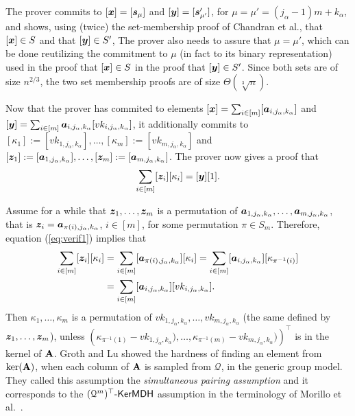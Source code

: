 The prover commits to $[{\boldsymbol{x}}]=[{\boldsymbol{s}}_\mu]$ and $[{\boldsymbol{y}}]=[{\boldsymbol{s}}'_{\mu'}]$, for $\mu=\mu'=(j_\alpha-1)m+k_\alpha$, and shows, using (twice) the set-membership proof of Chandran et al., that $[{\boldsymbol{x}}]\in S$ and that $[{\boldsymbol{y}}]\in S'$, 
The prover also needs to assure that $\mu=\mu'$, which can be done reutilizing the commitment to $\mu$ (in fact to its binary representation) used in the proof that $[{\boldsymbol{x}}]\in S$ in the proof that $[{\boldsymbol{y}}]\in S'$. Since both sets are of size $n^{2/3}$, the two set membership proofs are of size $\Theta(\sqrt[3]{n})$.
 
Now that the prover has commited to elements $[{\boldsymbol{x}}]=\sum_{i\in[m]}[{\boldsymbol{a}}_{i,j_\alpha,k_\alpha}]$ and $[{\boldsymbol{y}}]=\sum_{i\in[m]}{\boldsymbol{a}}_{i,j_\alpha,k_\alpha}[vk_{i,j_\alpha,k_\alpha}]$, it additionally commits to $[\kappa_1]:=[vk_{1,j_\alpha,k_\alpha}],\allowbreak\ldots,\allowbreak[\kappa_m]:=[vk_{m,j_\alpha,k_\alpha}]$ and $[{\boldsymbol{z}}_1]:=[{\boldsymbol{a}}_{1,j_\alpha,k_\alpha}],\ldots,[{\boldsymbol{z}}_m]:=[{\boldsymbol{a}}_{m,j_\alpha,k_\alpha}]$. The prover now gives a proof that
\begin{equation}
\sum_{i\in[m]}[{\boldsymbol{z}}_i][\kappa_i]=[{\boldsymbol{y}}][1]. \label{eq:verif1}
\end{equation}

Assume for a while that ${\boldsymbol{z}}_1,\ldots,{\boldsymbol{z}}_m$ is a permutation of ${\boldsymbol{a}}_{1,j_\alpha,k_\alpha},\ldots,{\boldsymbol{a}}_{m,j_\alpha,k_\alpha}$, that is ${\boldsymbol{z}}_i={\boldsymbol{a}}_{\pi(i),j_\alpha,k_\alpha}$, $i\in[m]$, for some permutation $\pi\in S_m$. Therefore, equation (\ref{eq:verif1}) implies that
\begin{align*}
\sum_{i\in[m]}[{\boldsymbol{z}}_i][\kappa_i]&=\sum_{i\in[m]}[{\boldsymbol{a}}_{\pi(i),j_\alpha,k_\alpha}][\kappa_i]=\sum_{i\in[m]}[{\boldsymbol{a}}_{i,j_\alpha,k_\alpha}][\kappa_{\pi^{-1}(i)}]\\
&=\sum_{i\in[m]}[{\boldsymbol{a}}_{i,j_\alpha,k_\alpha}][vk_{i,j_\alpha,k_\alpha}].
\end{align*}
Then $\kappa_1,\ldots,\kappa_m$ is a permutation of $vk_{1,j_\alpha,k_\alpha},\ldots,vk_{m,j_\alpha,k_\alpha}$ (the same defined by ${\boldsymbol{z}}_1,\ldots,{\boldsymbol{z}}_m$), unless $(\kappa_{\pi^{-1}(1)}-{vk_{1,j_\alpha,k_\alpha}),\ldots,\kappa_{\pi^{-1}(m)}-vk_{m,j_\alpha,k_\alpha})})^\top$ is in the kernel of $\mathbf{{A}}$. Groth and Lu showed the hardness of finding an element from $\ker(\mathbf{{A}})$, when each column of $\mathbf{{A}}$ is sampled from $\mathcal{Q}$, in the generic group model. They called this assumption the \emph{simultaneous pairing assumption} and it corresponds to the $(\mathcal{Q}^m)^\top\mbox{-}\mathsf{KerMDH}$ assumption in the terminology of Morillo et al.~\cite{AC:MorRafVil16}.

